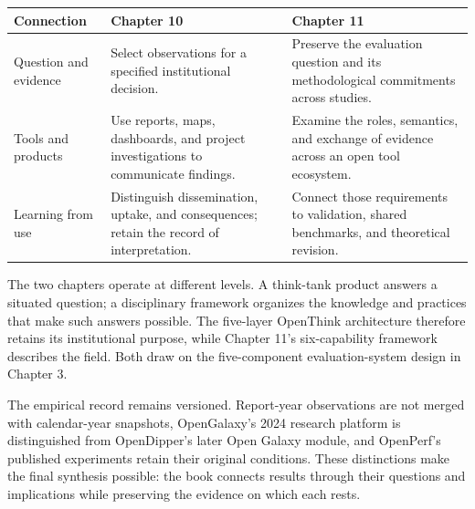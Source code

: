 \vspace{5pt}
\begingroup\small
\renewcommand{\arraystretch}{1.17}
\noindent\begin{tabularx}{\linewidth}{@{}>{\raggedright\arraybackslash}p{29mm}>{\raggedright\arraybackslash}X >{\raggedright\arraybackslash}X@{}}
\toprule
\textbf{Connection} & \textbf{Chapter 10} & \textbf{Chapter 11}\\
\midrule
Question and evidence & Select observations for a specified institutional decision. & Preserve the evaluation question and its methodological commitments across studies.\\[5pt]
Tools and products & Use reports, maps, dashboards, and project investigations to communicate findings. & Examine the roles, semantics, and exchange of evidence across an open tool ecosystem.\\[5pt]
Learning from use & Distinguish dissemination, uptake, and consequences; retain the record of interpretation. & Connect those requirements to validation, shared benchmarks, and theoretical revision.\\
\bottomrule
\end{tabularx}
\endgroup
\par\vspace{9pt}
The two chapters operate at different levels. A think-tank product answers a situated question; a disciplinary framework organizes the knowledge and practices that make such answers possible. The five-layer OpenThink architecture therefore retains its institutional purpose, while Chapter 11's six-capability framework describes the field. Both draw on the five-component evaluation-system design in Chapter 3.

The empirical record remains versioned. Report-year observations are not merged with calendar-year snapshots, OpenGalaxy's 2024 research platform is distinguished from OpenDipper's later Open Galaxy module, and OpenPerf's published experiments retain their original conditions. These distinctions make the final synthesis possible: the book connects results through their questions and implications while preserving the evidence on which each rests.
\clearpage
